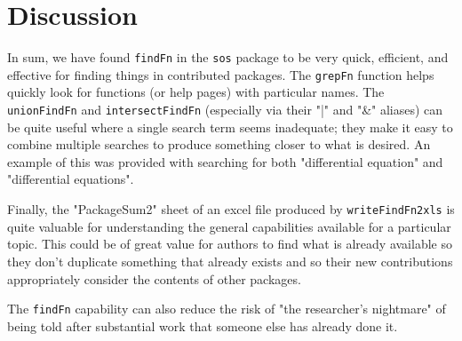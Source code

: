 \section*{Discussion}
In sum, we have found {\tt findFn} in the {\tt sos} package to
be very quick, efficient, and effective for finding things in
contributed packages.  The {\tt grepFn} function helps quickly
look for functions (or help pages) with particular names.
The {\tt unionFindFn} and {\tt intersectFindFn} (especially via
their "|" and "\&" aliases) can be quite useful where a single
search term seems inadequate;  they make it easy to combine 
multiple searches to produce something closer to what is desired.
An example of this was provided with searching for both
"differential equation" and "differential equations".

Finally, the "PackageSum2" sheet of an excel file produced by
{\tt writeFindFn2xls} is quite valuable for understanding the
general capabilities available for a particular topic.
This could be of great value for authors to find what is already
available so they don't duplicate something that already exists
and so their new contributions appropriately consider 
the contents of other packages.

The {\tt findFn} capability can also reduce the risk 
of "the researcher's nightmare" of being told after
substantial work that someone else has already done it.


